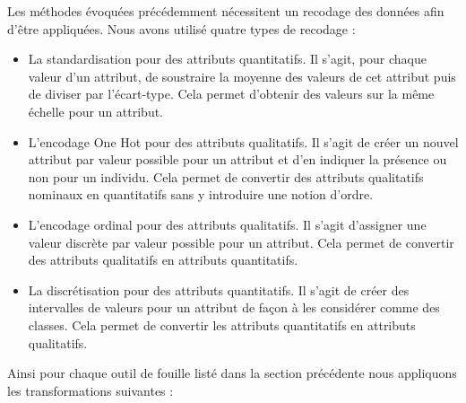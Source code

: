 \documentclass{ceri/sty/rapport}
\begin{document}
Les méthodes évoquées précédemment nécessitent un recodage des données afin d'être appliquées. Nous avons utilisé quatre types de recodage :\\
\begin{itemize}
    \item La standardisation pour des attributs quantitatifs. Il s'agit, pour chaque valeur d'un attribut, de soustraire la moyenne des valeurs de cet attribut puis de diviser par l'écart-type. Cela permet d'obtenir des valeurs sur la même échelle pour un attribut.\\
    
    \item L'encodage One Hot pour des attributs qualitatifs. Il s'agit de créer un nouvel attribut par valeur possible pour un attribut et d'en indiquer la présence ou non pour un individu. Cela permet de convertir des attributs qualitatifs nominaux en quantitatifs sans y introduire une notion d'ordre.\\
    
    \item L'encodage ordinal pour des attributs qualitatifs. Il s'agit d'assigner une valeur discrète par valeur possible pour un attribut. Cela permet de convertir des attributs qualitatifs en attributs quantitatifs.\\
    
    \item La discrétisation pour des attributs quantitatifs. Il s'agit de créer des intervalles de valeurs pour un attribut de façon à les considérer comme des classes. Cela permet de convertir les attributs quantitatifs en attributs qualitatifs. \\
\end{itemize}

Ainsi pour chaque outil de fouille listé dans la section précédente nous appliquons les transformations suivantes :\\
\end{document}
